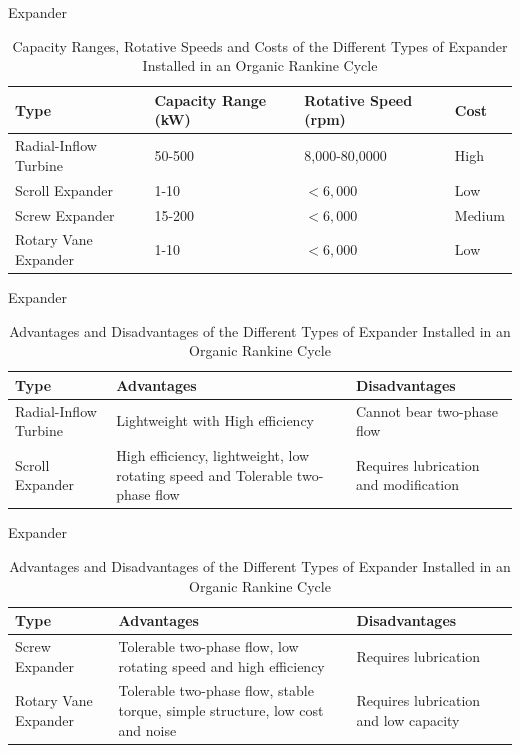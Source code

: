 \begin{frame}{Expander}
	\begin{table}[h]
		\centering
		\caption{\centering Capacity Ranges, Rotative Speeds and Costs of the Different Types of Expander Installed in an Organic Rankine Cycle\cite{pethurajan2018issues}}
		\label{tab:expandercapacityinORC}
		\begin{tabular}{|p{3.75cm}|p{2cm}|p{2.5cm}|p{1.5cm}|}
			\hline
			Type & Capacity Range (kW) & Rotative Speed (rpm) & Cost\\
			\hline
			Radial-Inflow Turbine & 50-500 & 8,000-80,0000 & High\\
			Scroll Expander & 1-10 & $<6,000$ & Low\\
			Screw Expander & 15-200 & $<6,000$ & Medium\\
			Rotary Vane Expander & 1-10 & $<6,000$ & Low\\
			\hline
		\end{tabular}
	\end{table}
\end{frame}

\begin{frame}{Expander}
    \begin{table}[h]
		\centering
		\caption{\centering Advantages and Disadvantages of the Different Types of Expander Installed in an Organic Rankine Cycle\cite{pethurajan2018issues}}
		\label{tab:expanderadvanddisadvinorc}
		\begin{tabular}{p{3cm}p{3.5cm}p{3.5cm}}
			\hline
			Type & Advantages & Disadvantages\\
			\hline
			Radial-Inflow Turbine & Lightweight with High efficiency & Cannot bear two-phase flow \\
			Scroll Expander & High efficiency, lightweight, low rotating speed and Tolerable two-phase flow & Requires lubrication and modification \\
			\hline
		\end{tabular}
	\end{table}
\end{frame}

\begin{frame}{Expander}
    \begin{table}[h]
		\centering
		\caption{\centering Advantages and Disadvantages of the Different Types of Expander Installed in an Organic Rankine Cycle\cite{pethurajan2018issues}}
		\label{tab:expanderadvanddisadvinorc}
		\begin{tabular}{p{3cm}p{3.5cm}p{3.5cm}}
			\hline
			Type & Advantages & Disadvantages\\
			\hline
			Screw Expander & Tolerable two-phase flow, low rotating speed and high efficiency & Requires lubrication \\
			Rotary Vane Expander & Tolerable two-phase flow, stable torque, simple structure, low cost and noise & Requires lubrication and low capacity \\
			\hline
		\end{tabular}
	\end{table}
\end{frame}

